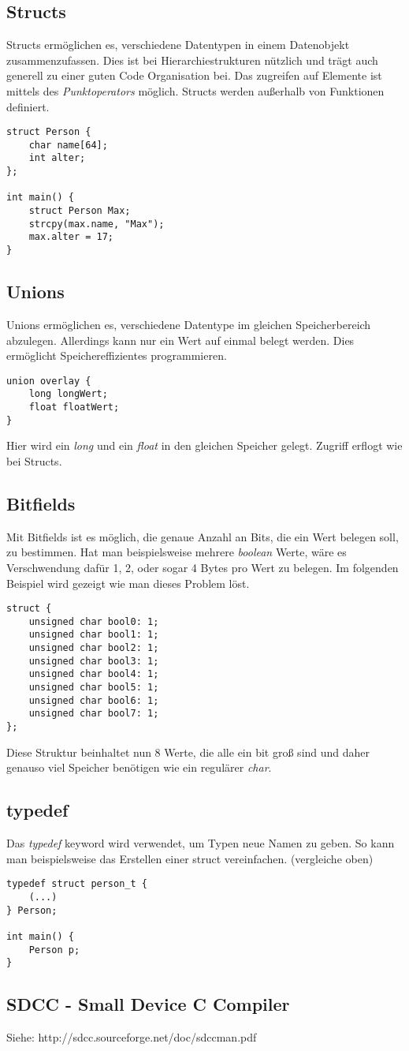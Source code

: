 \documentclass{article}
\begin{document}
\subsection{Structs}

Structs ermöglichen es, verschiedene Datentypen in einem Datenobjekt zusammenzufassen. Dies ist bei Hierarchiestrukturen nützlich und trägt auch generell zu einer guten Code Organisation bei. Das zugreifen auf Elemente ist mittels des \textit{Punktoperators} möglich.
Structs werden außerhalb von Funktionen definiert.
\begin{verbatim}
struct Person {
    char name[64];
    int alter;
};

int main() {
    struct Person Max;
    strcpy(max.name, "Max");
    max.alter = 17;
}
\end{verbatim}

\subsection{Unions}
Unions ermöglichen es, verschiedene Datentype im gleichen Speicherbereich abzulegen. Allerdings kann nur ein Wert auf einmal belegt werden. Dies ermöglicht Speichereffizientes programmieren.
\begin{verbatim}
union overlay {
    long longWert;
    float floatWert;
}
\end{verbatim}
Hier wird ein \textit{long} und ein \textit{float} in den gleichen Speicher gelegt. Zugriff erflogt wie bei Structs.

\subsection{Bitfields}
Mit Bitfields ist es möglich, die genaue Anzahl an Bits, die ein Wert belegen soll, zu bestimmen. Hat man beispielsweise mehrere \textit{boolean} Werte, wäre es Verschwendung dafür 1, 2, oder sogar 4 Bytes pro Wert zu belegen. Im folgenden Beispiel wird gezeigt wie man dieses Problem löst.
\newpage
\begin{verbatim}
struct {
    unsigned char bool0: 1;
    unsigned char bool1: 1;
    unsigned char bool2: 1;
    unsigned char bool3: 1;
    unsigned char bool4: 1;
    unsigned char bool5: 1;
    unsigned char bool6: 1;
    unsigned char bool7: 1;
};
\end{verbatim}
Diese Struktur beinhaltet nun 8 Werte, die alle ein bit groß sind und daher genauso viel Speicher benötigen wie ein regulärer \textit{char}.

\subsection{typedef}
Das \textit{typedef} keyword wird verwendet, um Typen neue Namen zu geben. So kann man beispielsweise das Erstellen einer struct vereinfachen. (vergleiche oben)
\begin{verbatim}
typedef struct person_t {
    (...)
} Person;

int main() {
    Person p;
}
\end{verbatim}

\subsection{SDCC - Small Device C Compiler}

Siehe: http://sdcc.sourceforge.net/doc/sdccman.pdf
\end{document}
